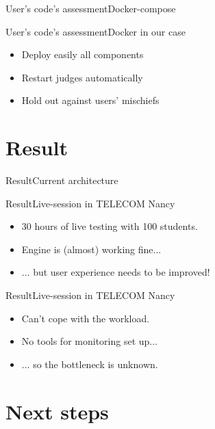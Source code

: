 \documentclass{beamer}
\begin{document}
\begin{frame}{User's code's assessment}{Docker-compose}
\end{frame}

\begin{frame}{User's code's assessment}{Docker in our case}
  \begin{itemize}
  \item{
    Deploy easily all components
  }
  \item {
    Restart judges automatically
  }
  \item {
    Hold out against users' mischiefs
  }
  \end{itemize}
\end{frame}

\section{Result}

\begin{frame}{Result}{Current architecture}
\end{frame}

\begin{frame}{Result}{Live-session in TELECOM Nancy}
  \begin{itemize}
  \item {
    30 hours of live testing with 100 students.
    \pause
  }
  \item {
    Engine is (almost) working fine...
    \pause
  }
  \item {
    ... but user experience needs to be improved!
  }
  \end{itemize}
\end{frame}


\begin{frame}{Result}{Live-session in TELECOM Nancy}
  \begin{itemize}
  \item {
    Can't cope with the workload.
    \pause
  }
  \item {
    No tools for monitoring set up...
    \pause
  }
  \item {
    ... so the bottleneck is unknown.
  }
  \end{itemize}
\end{frame}

\section{Next steps}
\end{document}
